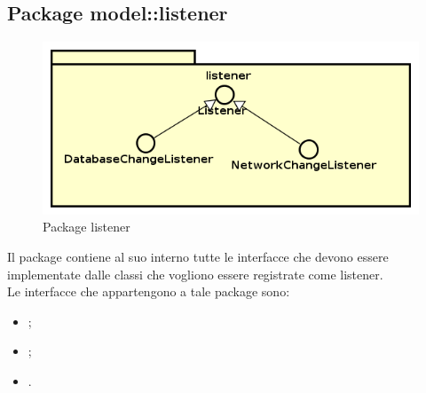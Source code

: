 \documentclass[../Tesi.tex]{subfiles}
\begin{document}
	\subsection{Package model::listener}
		\begin{figure}[H]
			\centering
			\includegraphics[scale=0.6]{images/package_diagrams/listener}
				\caption{Package listener}
		\end{figure}
		Il package  contiene al suo interno tutte le interfacce che devono essere implementate dalle classi che vogliono essere registrate come listener. \\
		Le interfacce che appartengono a tale package sono:
		\begin{itemize}
			\item {};
			\item {};
			\item {}.
		\end{itemize}
\end{document}
